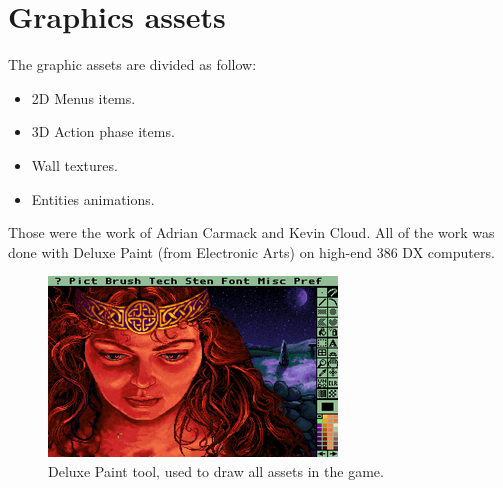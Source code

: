 \documentclass[book.tex]{subfiles}
\begin{document}
 
 
 




\section{Graphics assets}
The graphic assets are divided as follow:
\begin{itemize}
\item 2D Menus items.
\item 3D Action phase items.
\item Wall textures.
\item Entities animations.
\end{itemize}
Those were the work of Adrian Carmack and Kevin Cloud. All of the work was done with Deluxe Paint (from Electronic Arts) on high-end 386 DX computers. 

\begin{figure}[H]
  \centering
 \includegraphics[width=\textwidth]{imgs/deluxe_paint.png}
 \caption{Deluxe Paint tool, used to draw all assets in the game.}
\end{figure}
\end{document}
